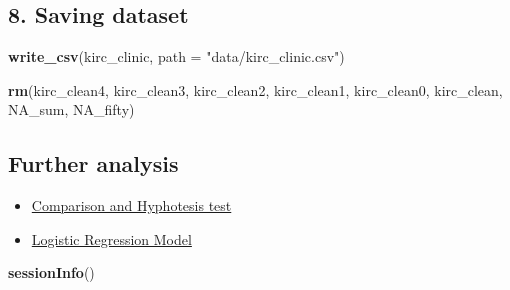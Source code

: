 \documentclass[]{article}
\newenvironment{Shaded}{\begin{snugshade}}{\end{snugshade}}
\newcommand{\KeywordTok}[1]{\textcolor[rgb]{0.13,0.29,0.53}{\textbf{#1}}}
\newcommand{\DataTypeTok}[1]{\textcolor[rgb]{0.13,0.29,0.53}{#1}}
\newcommand{\StringTok}[1]{\textcolor[rgb]{0.31,0.60,0.02}{#1}}
\newcommand{\NormalTok}[1]{#1}
\providecommand{\tightlist}{%
  \setlength{\itemsep}{0pt}\setlength{\parskip}{0pt}}
\begin{document}
\subsection{8. Saving dataset}\label{saving-dataset}

\begin{Shaded}
\begin{Highlighting}[]
\KeywordTok{write_csv}\NormalTok{(kirc_clinic, }\DataTypeTok{path =} \StringTok{"data/kirc_clinic.csv"}\NormalTok{)}

\KeywordTok{rm}\NormalTok{(kirc_clean4, kirc_clean3, kirc_clean2, kirc_clean1, kirc_clean0, kirc_clean, NA_sum, NA_fifty)}
\end{Highlighting}
\end{Shaded}

\subsection{Further analysis}\label{further-analysis}

\begin{itemize}
\tightlist
\item
  \href{2.correlation.md}{Comparison and Hyphotesis test}
\item
  \href{3.logistic_regression.md}{Logistic Regression Model}
\end{itemize}

\begin{Shaded}
\begin{Highlighting}[]
\KeywordTok{sessionInfo}\NormalTok{()}
\end{Highlighting}
\end{Shaded}
\end{document}
